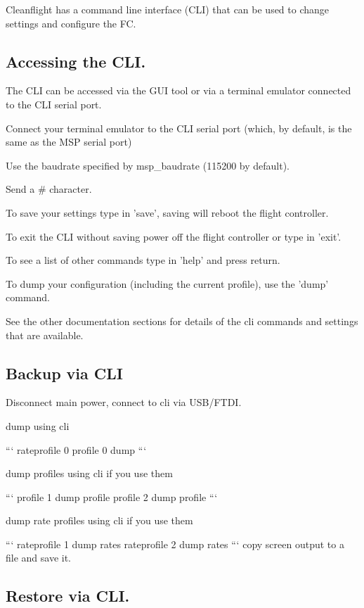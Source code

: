 Cleanflight has a command line interface (C\+L\+I) that can be used to change settings and configure the F\+C.

\subsection*{Accessing the C\+L\+I.}

The C\+L\+I can be accessed via the G\+U\+I tool or via a terminal emulator connected to the C\+L\+I serial port.


\begin{DoxyEnumerate}
\item Connect your terminal emulator to the C\+L\+I serial port (which, by default, is the same as the M\+S\+P serial port)
\item Use the baudrate specified by msp\+\_\+baudrate (115200 by default).
\item Send a {\ttfamily \#} character.
\end{DoxyEnumerate}

To save your settings type in 'save', saving will reboot the flight controller.

To exit the C\+L\+I without saving power off the flight controller or type in 'exit'.

To see a list of other commands type in 'help' and press return.

To dump your configuration (including the current profile), use the 'dump' command.

See the other documentation sections for details of the cli commands and settings that are available.

\subsection*{Backup via C\+L\+I}

Disconnect main power, connect to cli via U\+S\+B/\+F\+T\+D\+I.

dump using cli

``` rateprofile 0 profile 0 dump ```

dump profiles using cli if you use them

``` profile 1 dump profile profile 2 dump profile ```

dump rate profiles using cli if you use them

``` rateprofile 1 dump rates rateprofile 2 dump rates ``` copy screen output to a file and save it.

\subsection*{Restore via C\+L\+I.}

